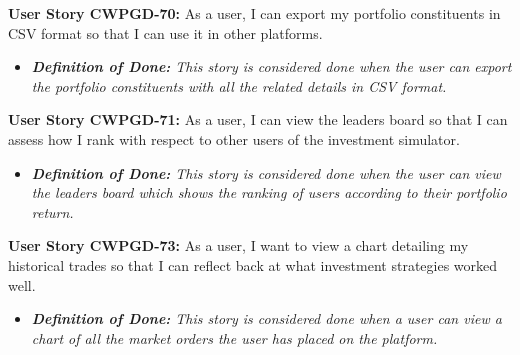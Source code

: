 \noindent \textbf{User Story CWPGD-70:} As a user, I can export my portfolio constituents in CSV format so that I can use it in other platforms.
\begin{itemize}
	\item \textit{\textbf{Definition of Done:} This story is considered done when the user can export the portfolio constituents with all the related details in CSV format.}
\end{itemize}

\noindent \textbf{User Story CWPGD-71:} As a user, I can view the leaders board so that I can assess how I rank with respect to other users of the investment simulator.
\begin{itemize}
	\item \textit{\textbf{Definition of Done:} This story is considered done when the user can view the leaders board which shows the ranking of users according to their portfolio return.}
\end{itemize}


\noindent \textbf{User Story CWPGD-73:} As a user, I want to view a chart detailing my historical trades so that I can reflect back at what investment strategies worked well.
\begin{itemize}
	\item \textit{\textbf{Definition of Done:} This story is considered done when a user can view a chart of all the market orders the user has placed on the platform.}
\end{itemize}


